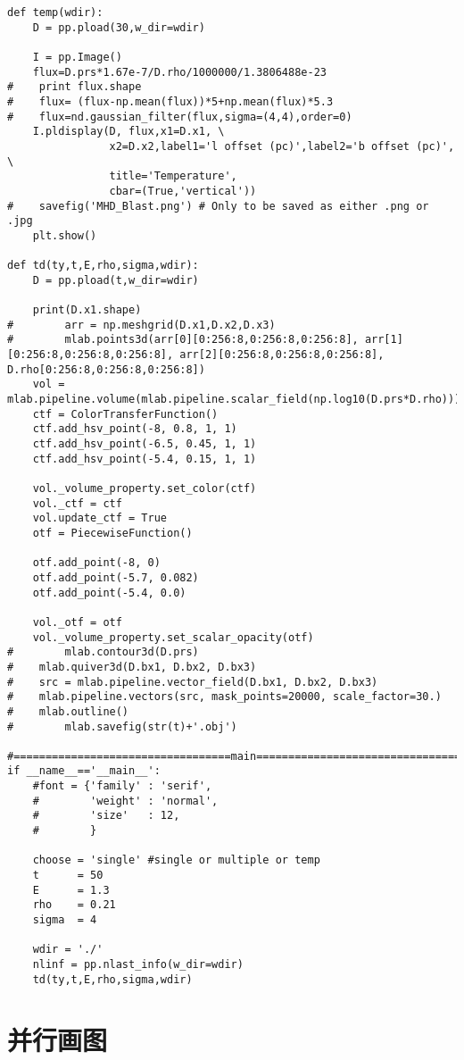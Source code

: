 \begin{lstlisting}
def temp(wdir):
    D = pp.pload(30,w_dir=wdir)

    I = pp.Image()
    flux=D.prs*1.67e-7/D.rho/1000000/1.3806488e-23
#    print flux.shape
#    flux= (flux-np.mean(flux))*5+np.mean(flux)*5.3
#    flux=nd.gaussian_filter(flux,sigma=(4,4),order=0)
    I.pldisplay(D, flux,x1=D.x1, \
                x2=D.x2,label1='l offset (pc)',label2='b offset (pc)',                                    \
                title='Temperature',
                cbar=(True,'vertical'))
#    savefig('MHD_Blast.png') # Only to be saved as either .png or .jpg
    plt.show()

def td(ty,t,E,rho,sigma,wdir):
    D = pp.pload(t,w_dir=wdir)

    print(D.x1.shape)
#        arr = np.meshgrid(D.x1,D.x2,D.x3)
#        mlab.points3d(arr[0][0:256:8,0:256:8,0:256:8], arr[1][0:256:8,0:256:8,0:256:8], arr[2][0:256:8,0:256:8,0:256:8], D.rho[0:256:8,0:256:8,0:256:8])
    vol = mlab.pipeline.volume(mlab.pipeline.scalar_field(np.log10(D.prs*D.rho)))
    ctf = ColorTransferFunction()
    ctf.add_hsv_point(-8, 0.8, 1, 1)
    ctf.add_hsv_point(-6.5, 0.45, 1, 1)
    ctf.add_hsv_point(-5.4, 0.15, 1, 1)

    vol._volume_property.set_color(ctf)
    vol._ctf = ctf
    vol.update_ctf = True
    otf = PiecewiseFunction()

    otf.add_point(-8, 0)
    otf.add_point(-5.7, 0.082)
    otf.add_point(-5.4, 0.0)

    vol._otf = otf
    vol._volume_property.set_scalar_opacity(otf)
#        mlab.contour3d(D.prs)
#    mlab.quiver3d(D.bx1, D.bx2, D.bx3)
#    src = mlab.pipeline.vector_field(D.bx1, D.bx2, D.bx3)
#    mlab.pipeline.vectors(src, mask_points=20000, scale_factor=30.)
#    mlab.outline()
#        mlab.savefig(str(t)+'.obj')

#==================================main========================================
if __name__=='__main__':
    #font = {'family' : 'serif',
    #        'weight' : 'normal',
    #        'size'   : 12,
    #        }

    choose = 'single' #single or multiple or temp
    t      = 50
    E      = 1.3
    rho    = 0.21
    sigma  = 4

    wdir = './'
    nlinf = pp.nlast_info(w_dir=wdir)
    td(ty,t,E,rho,sigma,wdir)

\end{lstlisting}


\section{并行画图}
\label{mpi4py}


